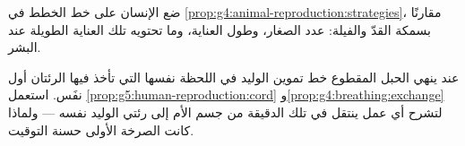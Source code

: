 \begin{exercise}[$\star\star$]\label{exo:g5:human-reproduction:10}
ضع الإنسان على خط الخطط في
\cref{prop:g4:animal-reproduction:strategies}، مقارنًا بسمكة القدّ
والفيلة: عدد الصغار، وطول العناية، وما تحتويه تلك العناية الطويلة
عند البشر.
\end{exercise}

\begin{exercise}[$\star\star\star$]\label{exo:g5:human-reproduction:11}
عند  ينهي الحبل المقطوع خط تموين الوليد في اللحظة نفسها
التي تأخذ فيها الرئتان أول نفَس. استعمل
\cref{prop:g5:human-reproduction:cord}
و\cref{prop:g4:breathing:exchange} لتشرح أي عمل ينتقل في تلك
الدقيقة من جسم الأم إلى رئتي الوليد نفسه --- ولماذا كانت الصرخة
الأولى حسنة التوقيت.
\end{exercise}
